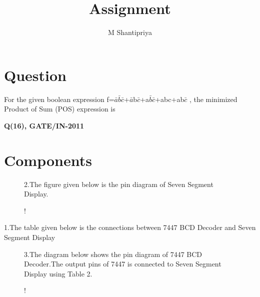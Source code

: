 \documentclass[journal,12pt,twocolumn]{IEEEtran}
\begin{document}
%

\theoremstyle{definition}
\newtheorem{theorem}{Theorem}[section]
\newtheorem{problem}{Problem}
\newtheorem{proposition}{Proposition}[section]
\newtheorem{lemma}{Lemma}[section]
\newtheorem{corollary}[theorem]{Corollary}
\newtheorem{example}{Example}[section]
\newtheorem{definition}{Definition}[section]
\newcommand{\BEQA}{\begin{eqnarray}}
\newcommand{\EEQA}{\end{eqnarray}}
\newcommand{\define}{\stackrel{\triangle}{=}}
\vspace{2cm}
\title{ 
Assignment
}

\author{M Shantipriya}


\maketitle
\tableofcontents
%
\section*{\textbf{Question}}

For the given boolean expression f=$\bar{a}$$\bar{b}$$\bar{c}$+$\bar{a}$b$\bar{c}$+a$\bar{b}$$\bar{c}$+abc+ab$\bar{c}$ , the minimized Product of Sum (POS) expression is
\begin{flushright}
\textbf{Q(16), GATE/IN-2011}
\end{flushright}
\section{\textbf{Components}}

\begin{table}[!h]
\centering
\caption{}
\label{table:7447_disp}
\end{table}

\begin{figure}[!h]
2.The figure given below is the pin diagram of Seven Segment Display.\\
\begin{center}
\resizebox {0.4\columnwidth} {!} {

}
\end{center}

\caption{}
\label{fig:sevenseg}
\end{figure}

\begin{table}[!h]
1.The table given below is the connections between 7447 BCD Decoder and Seven Segment Display\\
\centering

\caption{}
\label{table:7447_disp}
\end{table}
\begin{figure}[!h]
3.The diagram below shows the pin diagram of 7447 BCD Decoder.The output pins of 7447 is connected to Seven Segment Display using Table 2.
\begin{center}
\resizebox {1.2\columnwidth} {!} {

}
\end{center}
\caption{}
\label{fig:7447}
\end{figure}
\end{document}

